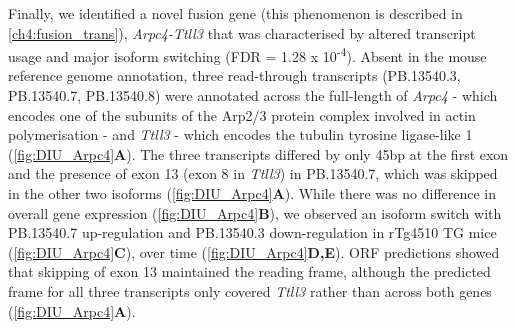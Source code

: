 Finally, we identified a novel fusion gene (this phenomenon is described in \cref{ch4:fusion_trans}), \textit{Arpc4-Ttll3} that was characterised by altered transcript usage and major isoform switching (FDR = 1.28 x 10\textsuperscript{-4}). Absent in the mouse reference genome annotation, three read-through transcripts (PB.13540.3, PB.13540.7, PB.13540.8) were annotated across the full-length of \textit{Arpc4} - which encodes one of the subunits of the Arp2/3 protein complex involved in actin polymerisation - and \textit{Ttll3} - which encodes the tubulin tyrosine ligase-like 1 (\cref{fig:DIU_Arpc4}\textbf{A}). The three transcripts differed by only 45bp at the first exon and the presence of exon 13 (exon 8 in \textit{Ttll3}) in PB.13540.7, which was skipped in the other two isoforms (\cref{fig:DIU_Arpc4}\textbf{A}). While there was no difference in overall gene expression (\cref{fig:DIU_Arpc4}\textbf{B}), we observed an isoform switch with PB.13540.7 up-regulation and  PB.13540.3 down-regulation in rTg4510 TG mice (\cref{fig:DIU_Arpc4}\textbf{C}), over time (\cref{fig:DIU_Arpc4}\textbf{D,E}). ORF predictions showed that skipping of exon 13 maintained the reading frame, although the predicted frame for all three transcripts only covered \textit{Ttll3} rather than across both genes (\cref{fig:DIU_Arpc4}\textbf{A}).  

